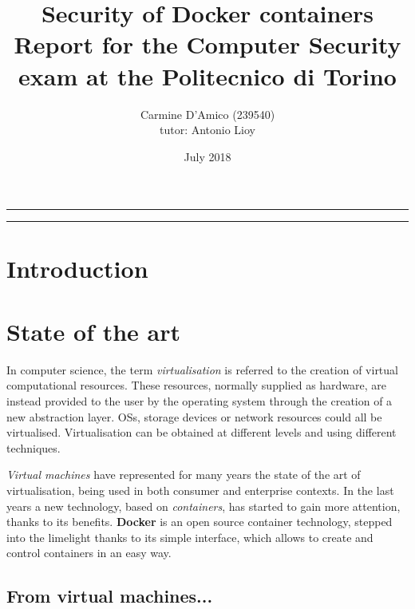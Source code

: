 \documentclass[a4paper,12pt]{article}
\begin{document}
\title{Security of Docker containers \\
{\normalsize Report for the Computer Security exam at the Politecnico di Torino}
} \author{Carmine D'Amico (239540) \\
{\normalsize tutor: Antonio Lioy} }
\date{July 2018}
\maketitle

\vfill

\rule{\textwidth}{1pt}

\tableofcontents

\rule{\textwidth}{1pt}

\vfill

\newpage

\section{Introduction}

\newpage

\section{State of the art}

In computer science, the term \textit{virtualisation} is referred to the
creation of virtual computational resources. These resources, normally supplied
as hardware, are instead provided to the user by the operating system through
the creation of a new abstraction layer. OSs, storage devices or network
resources could all be virtualised. Virtualisation can be obtained at different
levels and using different techniques. \par\textit{Virtual machines} have
represented for many years the state of the art of virtualisation, being used in
both consumer and enterprise contexts. In the last years a new technology, based
on \textit{containers}, has started to gain more attention, thanks to its
benefits. \textbf{Docker} is an open source container technology, stepped into 
the limelight thanks to its simple interface, which allows to create and control
containers in an easy way. 

\subsection{From virtual machines...}
\end{document}
